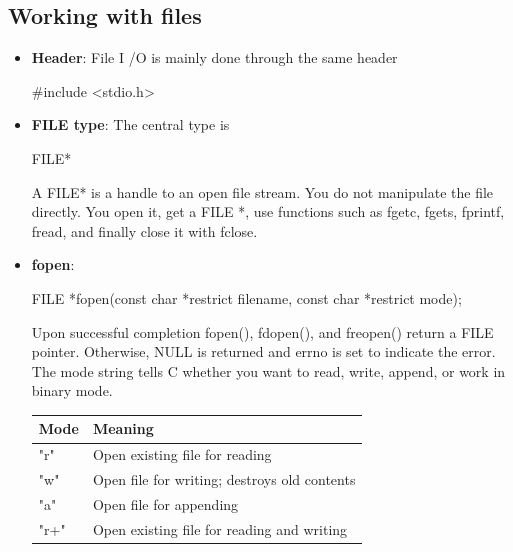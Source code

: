 \documentclass{report}
\begin{document}
\begin{itemize}
    \end{itemize}

    \pagebreak 
    \subsection{Working with files}
    \begin{itemize}
        \item \textbf{Header}: File I /O is mainly done through the same header
            \bigbreak \noindent 
            \begin{cppcode}
            #include <stdio.h>
            \end{cppcode}
        \item \textbf{FILE type}: The central type is
            \bigbreak \noindent 
            \begin{cppcode}
            FILE*
            \end{cppcode}
            \bigbreak \noindent 
            A FILE* is a handle to an open file stream. You do not manipulate the file directly. You open it, get a FILE *, use functions such as fgetc, fgets, fprintf, fread, and finally close it with fclose.
        \item \textbf{fopen}: 
            \bigbreak \noindent 
            \begin{cppcode}
            FILE *fopen(const char *restrict filename, const char *restrict mode);
            \end{cppcode}
            \bigbreak \noindent 
            Upon successful completion fopen(), fdopen(), and freopen() return a FILE pointer.  Otherwise, NULL is returned and errno is set to indicate the error.
            \bigbreak \noindent 
            The mode string tells C whether you want to read, write, append, or work in binary mode. 
            \bigbreak \noindent 
            \begin{center}
                \begin{tabularx}{\textwidth}{@{}lX@{}}
                    \toprule
                    \textbf{Mode}	&\textbf{Meaning} \\
                    \midrule
                    "r"	    &Open existing file for reading\\[2ex]
                    "w"	    &Open file for writing; destroys old contents\\[2ex]
                    "a"	    &Open file for appending\\[2ex]
                    "r+"	&Open existing file for reading and writing\\[2ex]

\end{tabularx}
\end{center}
\end{itemize}
\end{document}
